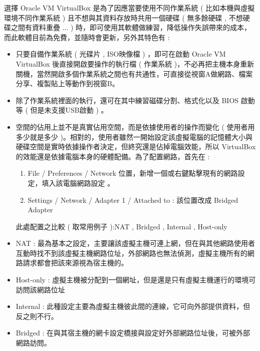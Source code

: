 \documentclass[14pt,a4paper]{report}  %
\begin{document}
 選擇 Oracle VM VirtualBox    是為了因應當要使用不同作業系統 ( 比如本機與虛擬環境不同作業系統  ) 且不想與其資料存放時共用一個硬碟 ( 無多餘硬碟 , 不想硬碟之間有資料重疊 ... ) 時，即可使用其軟體做練習，降低操作失誤帶來的成本，而此軟體目前為免費，並隨時會更新，另外其特色有 :\\  
\begin{itemize}


\item 只要自備作業系統 ( 光碟片 , ISO映像檔 ) ，即可在啟動 Oracle VM VirtualBox  後直接開啟要操作的執行檔 ( 作業系統 )，不必再把主機本身重新關機，當然開啟多個作業系統之間也有共通性，可直接從視窗A做網路、檔案分享、複製貼上等動作到視窗B。\\
\item 除了作業系統裡面的執行，還可在其中練習磁碟分割、格式化以及 BIOS 啟動等 ( 但是未支援USB啟動 ) 。\\
\item 空間的佔用上並不是真實佔用空間，而是依據使用者的操作而變化 ( 使用者用多少就是多少 )。相對的，使用者雖然一開始設定該虛擬電腦的記憶體大小與硬碟空間是實時依據操作者決定，但終究還是佔掉電腦效能，所以 VirtualBox 的效能還是依據電腦本身的硬體配備。為了配置網路，首先在 : 
\begin{enumerate}
\item File / Preferences / Network  位置，新增一個或右鍵點擊現有的網路設定，填入該電腦網路設定 。
\item Settings / Network / Adapter 1 / Attached to :  該位置改成  Bridged Adapter
\end{enumerate}
\qquad 此處配置之比較 ( 取常用例子 ):NAT , Bridged , Internal , Host-only
\item NAT : 最為基本之設定，主要讓該虛擬主機可連上網，但在與其他網路使用者互動時找不到該虛擬主機網路位址，外部網路也無法偵測，虛擬主機所有的網路請求都會把該來源視為宿主機的。
\item Host-only : 虛擬主機被分配到一個網址，但是還是只有虛擬主機運行的環境可訪問該網路位址
\item Internal : 此種設定主要為虛擬主機彼此間的連線，它可向外部提供資料，但反之則不行。
\item Bridged : 在與其宿主機的網卡設定橋接與設定好外部網路位址後，可被外部網路訪問。
\end{itemize}
\newpage
\end{document}
